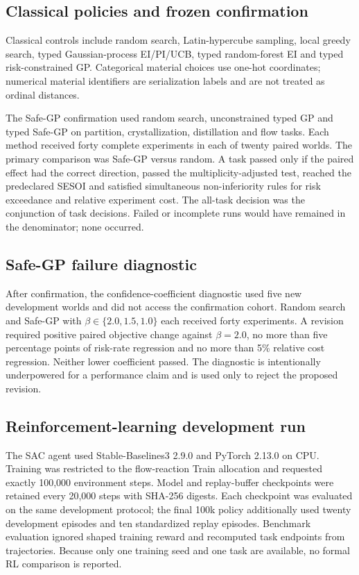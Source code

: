 \documentclass[11pt]{article}
\begin{document}
\subsection*{Classical policies and frozen confirmation}

Classical controls include random search, Latin-hypercube sampling, local greedy search, typed Gaussian-process EI/PI/UCB, typed random-forest EI and typed risk-constrained GP. Categorical material choices use one-hot coordinates; numerical material identifiers are serialization labels and are not treated as ordinal distances.

The Safe-GP confirmation used random search, unconstrained typed GP and typed Safe-GP on partition, crystallization, distillation and flow tasks. Each method received forty complete experiments in each of twenty paired worlds. The primary comparison was Safe-GP versus random. A task passed only if the paired effect had the correct direction, passed the multiplicity-adjusted test, reached the predeclared SESOI and satisfied simultaneous non-inferiority rules for risk exceedance and relative experiment cost. The all-task decision was the conjunction of task decisions. Failed or incomplete runs would have remained in the denominator; none occurred.

\subsection*{Safe-GP failure diagnostic}

After confirmation, the confidence-coefficient diagnostic used five new development worlds and did not access the confirmation cohort. Random search and Safe-GP with $\beta \in \{2.0,1.5,1.0\}$ each received forty experiments. A revision required positive paired objective change against $\beta=2.0$, no more than five percentage points of risk-rate regression and no more than 5\% relative cost regression. Neither lower coefficient passed. The diagnostic is intentionally underpowered for a performance claim and is used only to reject the proposed revision.

\subsection*{Reinforcement-learning development run}

The SAC agent used Stable-Baselines3 2.9.0 and PyTorch 2.13.0 on CPU. Training was restricted to the flow-reaction Train allocation and requested exactly 100,000 environment steps. Model and replay-buffer checkpoints were retained every 20,000 steps with SHA-256 digests. Each checkpoint was evaluated on the same development protocol; the final 100k policy additionally used twenty development episodes and ten standardized replay episodes. Benchmark evaluation ignored shaped training reward and recomputed task endpoints from trajectories. Because only one training seed and one task are available, no formal RL comparison is reported.
\end{document}

